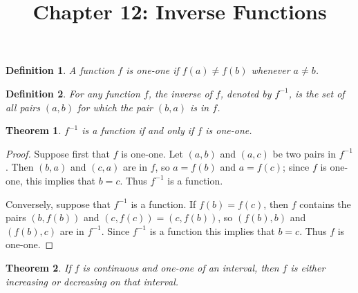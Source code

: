 \documentclass{article}
\newtheorem{definition}{Definition}
\newtheorem{theorem}{Theorem}
\begin{document}
\title{Chapter 12: Inverse Functions}
\maketitle

\begin{definition}
  A function $f$ is \emph{one-one} if $f(a) \neq f(b)$ whenever $a \neq b$.
\end{definition}

\begin{definition}
  For any function $f$, the \emph{inverse} of $f$, denoted by $f^{-1}$, is the
  set of all pairs $(a, b)$ for which the pair $(b, a)$ is in $f$.
\end{definition}

\begin{theorem}
  $f^{-1}$ is a function if and only if $f$ is one-one.
\end{theorem}

\begin{proof}
  Suppose first that $f$ is one-one. Let $(a, b)$ and $(a, c)$ be two pairs in
  $f^{-1}$. Then $(b, a)$ and $(c, a)$ are in $f$, so $a = f(b)$ and $a =
  f(c)$; since $f$ is one-one, this implies that $b = c$. Thus $f^{-1}$ is a
  function.

  Conversely, suppose that $f^{-1}$ is a function. If $f(b) = f(c)$, then $f$
  contains the pairs $(b, f(b))$ and $(c, f(c)) = (c, f(b))$, so $(f(b), b)$
  and $(f(b), c)$ are in $f^{-1}$. Since $f^{-1}$ is a function this implies
  that $b = c$. Thus $f$ is one-one.
\end{proof}

\begin{theorem}
  If $f$ is continuous and one-one of an interval, then $f$ is either
  increasing or decreasing on that interval.
\end{theorem}
\end{document}
